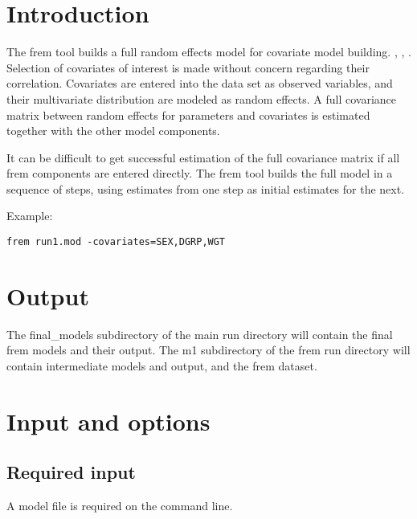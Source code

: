 
\usepackage{amsmath}
\usepackage{hyperref}

\newcommand{\guidetoolname}{frem}

\maketitle
\tableofcontents
\newpage

\section{Introduction}
The frem tool builds a full random effects model for covariate model building. \cite{Karlsson}, \cite{Ivaturi}, \cite{Yun}.
Selection of covariates of interest is made without concern regarding their correlation.
Covariates are entered into the data set as observed variables, and their multivariate distribution are modeled
as random effects. A full covariance matrix between random effects for parameters and covariates is estimated
together with the other model components.

It can be difficult to get successful estimation of the full covariance matrix if all frem components are entered directly.
The frem tool builds the full model in a sequence of steps, using estimates from one step as initial estimates for the next.

Example:
\begin{verbatim}
frem run1.mod -covariates=SEX,DGRP,WGT
\end{verbatim}

\section{Output}
The final\_models subdirectory of the main run directory will contain the final frem models and their output.
The m1 subdirectory of the frem run directory will contain intermediate models and output, and the frem dataset.

\section{Input and options}
\subsection{Required input}
A model file is required on the command line.

